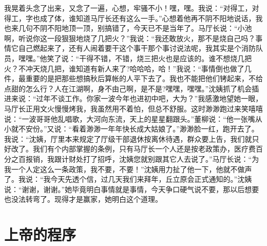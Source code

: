 \documentclass[12pt,oneside]{book}
\begin{document}
我晃着头念了出来，又念了一遍，心想，牢骚不小！嘿，嘿。我说：``对得工，对得工，字也成了体，谁知道马厅长还有这么一手。''心想着他再不阴不阳地说话，我也来几句不阴不阳地顶一顶，别搞错了，今天已不是当年了。马厅长说：``小池啊，听说你这一段狠狠地烧了几把火？''我说：``我还敢放火，那不是烧自己吗？事情它自己燃起来了，还有人闹着要干这个事干那个事讨说法呢，我其实是个消防队员，嘿嘿。''他笑了说：``干得不错，不错，烧三把火也是应该的。谁不想烧几把火？不冲天烧几把，谁知道有新人来了?哈哈哈，哈！''我说：``事情倒也做了几件，最重要的是把那些想搞秋后算帐的人平下去了。我也不能把他们铐起来，不给点甜的怎么行？人在江湖啊，身不由己啊，是不是?嘿嘿，嘿嘿。''沈姨抓了机会插进来说：``过年不谈工作。你家一波今年也进初中吧，大为？''我感激地望她一眼，马厅长正用文火慢慢烤我，我虽然用不着怕，但总不舒服。这时渺渺跑过来笑嘻嘻说：``一波哥哥他乱唱歌，大河向东流，天上的星星翻跟头。''董柳说：``他一张嘴从小就不安份。''又说：``看着渺渺一年年快长成大姑娘了。''渺渺脸一红，跑开去了。我说：``沈姨，厅里本来规定了厅级干部退休按离休待遇，群众要上告，我们就只好改了。我们有个内部掌握的条例，只有马厅长一个人还是按老政策办，医疗费百分之百报销，我跟计财处打了招呼，沈姨您就别跟其它人去说了。''马厅长说：``为我一个人定这么一条政策，我不要，不要！''沈姨用力扯了他一下，他就不做声了。我说：``我今天先透个信，过几天我们来拜年，丘立原会正式通知的。''沈姨说：``谢谢，谢谢。''她毕竟明白事情就是事情，今天争口硬气说不要，那以后想要也没法转弯了。现得才是赢家，她明白这个道理。


\chapter{上帝的程序}
\end{document}
